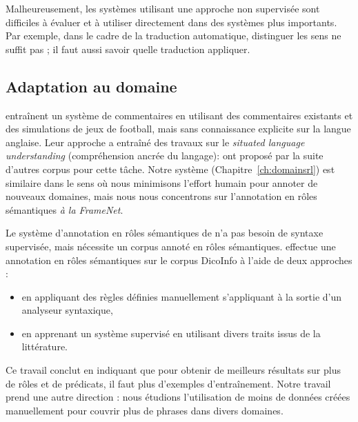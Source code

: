 Malheureusement, les systèmes utilisant une approche non supervisée sont
difficiles à évaluer et à utiliser directement dans des systèmes plus
importants. Par exemple, dans le cadre de la traduction automatique, distinguer
les sens ne suffit pas ; il faut aussi savoir quelle traduction appliquer.

\subsection{Adaptation au domaine}

\cite{chen2008learning} entraînent un système de commentaires en utilisant des
commentaires existants et des simulations de jeux de football, mais sans
connaissance explicite sur la langue anglaise. Leur approche a entraîné des
travaux sur le \emph{situated language understanding} (compréhension ancrée du
langage): \cite{bordes2010towards,richardson2012towards} ont proposé par la
suite d'autres corpus pour cette tâche. Notre système
(Chapitre~\ref{ch:domainsrl}) est similaire dans le sens où nous minimisons
l'effort humain pour annoter de nouveaux domaines, mais nous nous concentrons
sur l'annotation en rôles sémantiques \emph{à la FrameNet}.

Le système d'annotation en rôles sémantiques de \cite{gormley2014low} n'a pas
besoin de syntaxe supervisée, mais nécessite un corpus annoté en rôles
sémantiques. \cite{hadouche2011annotation} effectue une annotation en rôles
sémantiques sur le corpus DicoInfo \citep{corpusolst} à l'aide de deux
approches :

\begin{itemize}
    \item en appliquant des règles définies manuellement s'appliquant à la
        sortie d'un analyseur syntaxique,
    \item en apprenant un système supervisé en utilisant divers traits issus de
        la littérature.
\end{itemize}

Ce travail conclut en indiquant que pour obtenir de meilleurs résultats sur
plus de rôles et de prédicats, il faut plus d'exemples d'entraînement. Notre
travail prend une autre direction : nous étudions l'utilisation de moins de
données créées manuellement pour couvrir plus de phrases dans divers domaines.
